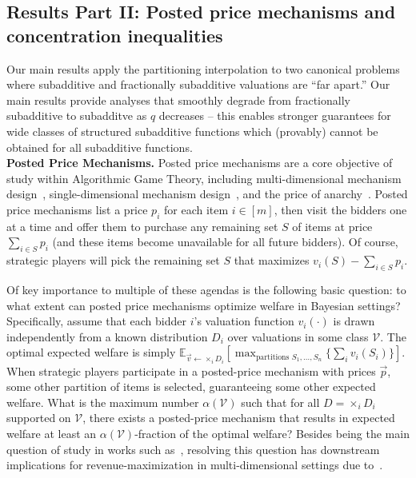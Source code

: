 \documentclass[11pt]{article}\usepackage{amsfonts}
\numberwithin{theorem}{subsection}
\begin{document}
\subsection{Results Part II: Posted price mechanisms and concentration inequalities}

Our main results apply the partitioning interpolation to two canonical problems where subadditive and fractionally subadditive valuations are ``far apart.'' Our main results provide analyses that smoothly degrade from fractionally subadditive to subadditve as $q$ decreases -- this enables stronger guarantees for wide classes of structured subadditive functions which (provably) cannot be obtained for all subadditive functions.\\

\noindent\textbf{Posted Price Mechanisms.} Posted price mechanisms are a core objective of study within Algorithmic Game Theory, including multi-dimensional mechanism design~\cite{ChawlaHMS10}, single-dimensional mechanism design~\cite{Yan11,AlaeiHNPY15}, and the price of anarchy~\cite{FeldmanGL15, DuttingFKL20}. Posted price mechanisms list a price $p_i$ for each item $i \in [m]$, then visit the bidders one at a time and offer them to purchase any remaining set $S$ of items at price $\sum_{i \in S} p_i$ (and these items become unavailable for all future bidders). Of course, strategic players will pick the remaining set $S$ that maximizes $v_i(S) - \sum_{i \in S} p_i$. 

Of key importance to multiple of these agendas is the following basic question: to what extent can posted price mechanisms optimize welfare in Bayesian settings? Specifically, assume that each bidder $i$'s valuation function $v_i(\cdot)$ is drawn independently from a known distribution $D_i$ over valuations in some class $\mathcal{V}$. The optimal expected welfare is simply $\mathbb{E}_{\vec{v}\leftarrow \times_i D_i}[\max_{\text{partitions } S_1,\ldots, S_n}\{\sum_i v_i(S_i)\}]$. When strategic players participate in a posted-price mechanism with prices $\vec{p}$, some other partition of items is selected, guaranteeing some other expected welfare. What is the maximum number $\alpha(\mathcal{V})$ such that for all $D = \times_i D_i$ supported on $\mathcal{V}$, there exists a posted-price mechanism that results in expected welfare at least an $\alpha(\mathcal{V})$-fraction of the optimal welfare? Besides being the main question of study in works such as~\cite{FeldmanGL15,DuttingFKL20,DuttingKL20}, resolving this question has downstream implications for revenue-maximization in multi-dimensional settings due to~\cite{CaiZ17}. 
\end{document}
